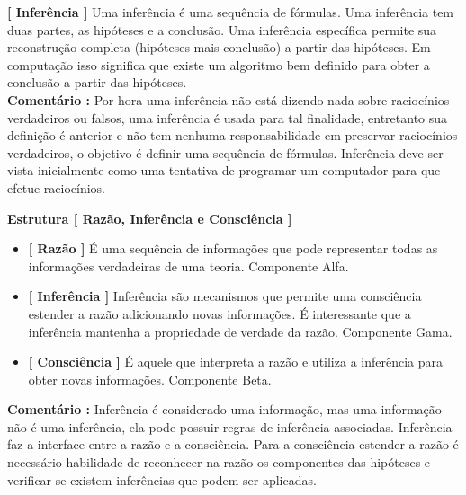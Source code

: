 \documentclass[10pt,a4paper]{report}
\begin{document}
\textbf{[ Inferência ]} Uma inferência é uma sequência de fórmulas. Uma inferência tem duas partes, as hipóteses e a conclusão. Uma inferência específica permite sua reconstrução completa (hipóteses mais conclusão) a partir das hipóteses. Em computação isso significa que existe um algoritmo bem definido para obter a conclusão a partir das hipóteses. \\

\textbf{Comentário :} Por hora uma inferência não está dizendo nada sobre raciocínios verdadeiros ou falsos, uma inferência é usada para tal finalidade, entretanto sua definição é anterior e não tem nenhuma responsabilidade em preservar raciocínios verdadeiros, o objetivo é definir uma sequência de fórmulas. Inferência deve ser vista inicialmente como uma tentativa de programar um computador para que efetue raciocínios. 

\hspace{\baselineskip}

\textbf{Estrutura [ Razão, Inferência e Consciência ]}

\begin{itemize}
	\item[ (i) ] \textbf{[ Razão ]} É uma sequência de informações que pode representar todas as informações verdadeiras de uma teoria. Componente Alfa.
	\item[ (ii) ] \textbf{[ Inferência ]} Inferência são mecanismos que permite uma consciência estender a razão adicionando novas informações. É interessante que a inferência mantenha a propriedade de verdade da razão. Componente Gama.
	\item[ (iii) ] \textbf{[ Consciência ]} É aquele que interpreta a razão e utiliza a inferência para obter novas informações. Componente Beta.
\end{itemize}

\textbf{Comentário :} Inferência é considerado uma informação, mas uma informação não é uma inferência, ela pode possuir regras de inferência associadas. Inferência faz a interface entre a razão e a consciência. Para a consciência estender a razão é necessário habilidade de reconhecer na razão os componentes das hipóteses e verificar se existem inferências que podem ser aplicadas.
\end{document}
